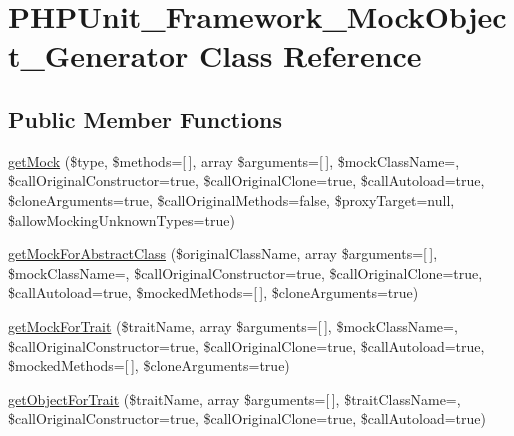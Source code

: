 \hypertarget{class_p_h_p_unit___framework___mock_object___generator}{}\section{P\+H\+P\+Unit\+\_\+\+Framework\+\_\+\+Mock\+Object\+\_\+\+Generator Class Reference}
\label{class_p_h_p_unit___framework___mock_object___generator}
\subsection*{Public Member Functions}
\begin{DoxyCompactItemize}
\item 
\mbox{\hyperlink{class_p_h_p_unit___framework___mock_object___generator_a4aa75cc7322a03dd24fb69af2e52855f}{get\+Mock}} (\$type, \$methods=\mbox{[}$\,$\mbox{]}, array \$arguments=\mbox{[}$\,$\mbox{]}, \$mock\+Class\+Name=\textquotesingle{}\textquotesingle{}, \$call\+Original\+Constructor=true, \$call\+Original\+Clone=true, \$call\+Autoload=true, \$clone\+Arguments=true, \$call\+Original\+Methods=false, \$proxy\+Target=null, \$allow\+Mocking\+Unknown\+Types=true)
\item 
\mbox{\hyperlink{class_p_h_p_unit___framework___mock_object___generator_a48f47851bf11e93ca38eae5fef655e6c}{get\+Mock\+For\+Abstract\+Class}} (\$original\+Class\+Name, array \$arguments=\mbox{[}$\,$\mbox{]}, \$mock\+Class\+Name=\textquotesingle{}\textquotesingle{}, \$call\+Original\+Constructor=true, \$call\+Original\+Clone=true, \$call\+Autoload=true, \$mocked\+Methods=\mbox{[}$\,$\mbox{]}, \$clone\+Arguments=true)
\item 
\mbox{\hyperlink{class_p_h_p_unit___framework___mock_object___generator_a0ac3712032983624f4878e129fc73f8f}{get\+Mock\+For\+Trait}} (\$trait\+Name, array \$arguments=\mbox{[}$\,$\mbox{]}, \$mock\+Class\+Name=\textquotesingle{}\textquotesingle{}, \$call\+Original\+Constructor=true, \$call\+Original\+Clone=true, \$call\+Autoload=true, \$mocked\+Methods=\mbox{[}$\,$\mbox{]}, \$clone\+Arguments=true)
\item 
\mbox{\hyperlink{class_p_h_p_unit___framework___mock_object___generator_a858ff8de619f3734580faccc53ce6145}{get\+Object\+For\+Trait}} (\$trait\+Name, array \$arguments=\mbox{[}$\,$\mbox{]}, \$trait\+Class\+Name=\textquotesingle{}\textquotesingle{}, \$call\+Original\+Constructor=true, \$call\+Original\+Clone=true, \$call\+Autoload=true)

\end{DoxyCompactItemize}
